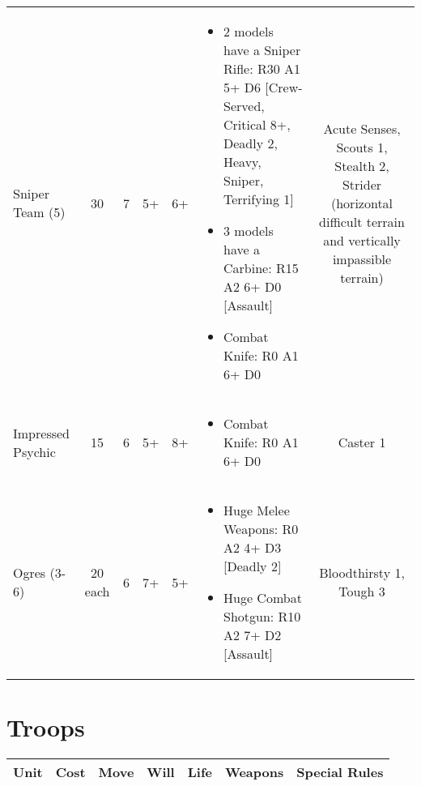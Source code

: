 \documentclass[landscape]{extarticle}
\begin{document}
\begin{small}
\begin{tabular}{UccccWS}
\\



Sniper Team (5)
&
30
&
7
&
5+
&
6+
&
\begin{itemize}
    \item 2 models have a Sniper Rifle: R30 A1 5+ D6 [Crew-Served, Critical 8+, Deadly 2, Heavy, Sniper, Terrifying 1]
    \item 3 models have a Carbine: R15 A2 6+ D0 [Assault]
    \item Combat Knife: R0 A1 6+ D0
\end{itemize}
&
Acute Senses, Scouts 1, Stealth 2, Strider (horizontal difficult terrain and vertically impassible terrain)


\\


Impressed Psychic
&
15
&
6
&
5+
&
8+
&
\begin{itemize}
    \item Combat Knife: R0 A1 6+ D0
\end{itemize}
&
Caster 1


\\


Ogres (3-6)
&
20 each
&
6
&
7+
&
5+
&
\begin{itemize}
    \item Huge Melee Weapons: R0 A2 4+ D3 [Deadly 2]
    \item Huge Combat Shotgun: R10 A2 7+ D2 [Assault]
\end{itemize}
&
Bloodthirsty 1, Tough 3
\end{tabular}








\section*{Troops}

\begin{tabular}{UccccWS}

\textbf{Unit} & \textbf{Cost} & \textbf{Move} & \textbf{Will} & \textbf{Life} & \textbf{Weapons} & \textbf{Special Rules} \\


\hline



\end{tabular}
\end{small}
\end{document}
